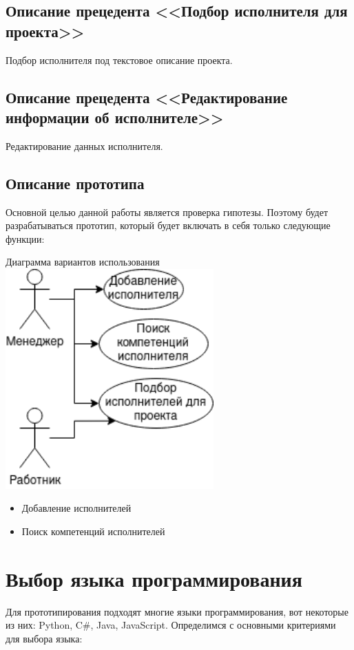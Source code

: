 \documentclass[PI,KR]{HSEUniversity}
\begin{document}
\subsection{Описание прецедента <<Подбор исполнителя для проекта>>}
Подбор исполнителя под текстовое описание проекта.
\subsection{Описание прецедента <<Редактирование информации об исполнителе>>}
Редактирование данных исполнителя.
\subsection{Описание прототипа}
Основной целью данной работы является проверка гипотезы. Поэтому будет разрабатываться прототип, который будет включать в себя только следующие функции:
\begin{FIGURE}[h]{Диаграмма вариантов использования \label{fig:figure3}}
	\includegraphics[width=0.6\textwidth]{img/Диаграмма вариантов использования прототипа}
\end{FIGURE}
\begin{itemize}
	\item Добавление исполнителей
	\item Поиск компетенций исполнителей
\end{itemize}
\section{Выбор языка программирования}
Для прототипирования подходят многие языки программирования, вот некоторые из них: Python, C\#, Java, JavaScript. Определимся с основными критериями для выбора языка:
\end{document}
